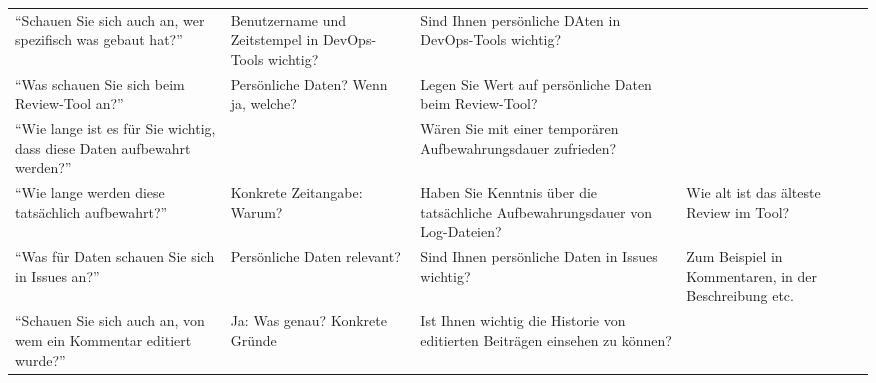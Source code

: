 \begin{table*}
{\begin{tabularx}{\linewidth}{XXXX}
        \enquote{Schauen Sie sich auch an, wer spezifisch was gebaut hat?}                                                  & Benutzername und Zeitstempel in DevOps-Tools wichtig?                                 & Sind Ihnen persönliche DAten in DevOps-Tools wichtig?                                                                         &                                                                                               \\
        \enquote{Was schauen Sie sich beim Review-Tool an?}                                                                 & Persönliche Daten? Wenn ja, welche?                                                   & Legen Sie Wert auf persönliche Daten beim Review-Tool?                                                                        &                                                                                               \\
        \enquote{Wie lange ist es für Sie wichtig, dass diese Daten aufbewahrt werden?}                                     &                                                                                       & Wären Sie mit einer temporären Aufbewahrungsdauer zufrieden?                                                                  &                                                                                               \\
        \enquote{Wie lange werden diese tatsächlich aufbewahrt?}                                                            & Konkrete Zeitangabe: Warum?                                                           & Haben Sie Kenntnis über die tatsächliche Aufbewahrungsdauer von Log-Dateien?                                                  & Wie alt ist das älteste Review im Tool?                                                       \\
        \enquote{Was für Daten schauen Sie sich in Issues an?}                                                              & Persönliche Daten relevant?                                                           & Sind Ihnen persönliche Daten in Issues wichtig?                                                                               & Zum Beispiel in Kommentaren, in der Beschreibung etc.                                         \\
        \enquote{Schauen Sie sich auch an, von wem ein Kommentar editiert wurde?}                                           & Ja: Was genau? Konkrete Gründe                                                        & Ist Ihnen wichtig die Historie von editierten Beiträgen einsehen zu können?                                                   &                                                                                               \\

\end{tabularx}}
\end{table*}
